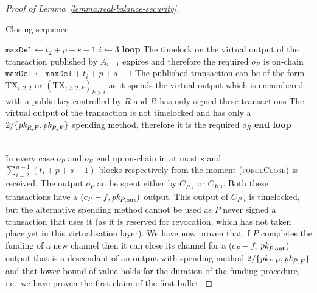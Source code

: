 \begin{proof}[Proof of Lemma~\ref{lemma:real-balance-security}]
  \begin{center}
    \begin{notitlebox}{Closing sequence}
      \begin{algorithmic}[1]
        \State $\texttt{maxDel} \gets t_2 + p + s - 1$ 
        \State $i \gets 3$
        \label{code:settling-process:init-i}
        \State \textbf{loop}
        \Indent
            \State The timelock on the virtual output of the transaction
            published by $A_{i-1}$ expires and therefore the required $o_R$ is
            on-chain
          \Else \: 
            \State $\texttt{maxDel} \gets \texttt{maxDel} + t_i + p + s - 1$
            \State The published transaction can be of the form $\mathrm{TX}_{i,
            2, 2}$ or $(\mathrm{TX}_{i, 3, 2, k})_{k > i}$ as it spends the
            virtual output which is encumbered with a public key controlled by
            $R$ and $R$ has only signed these transactions
             
              \State The virtual output of the transaction is not timelocked and
              has only a $2/\{\textit{pk}_{R, F}, \textit{pk}_{\bar{R}, F}\}$ spending method,
              therefore it is the required $o_R$
            \Else \: 
              \label{code:settling-process:increment}
            \EndIf
          \EndIf
        \EndIndent
        \State \textbf{end loop}
        \State {}
      \end{algorithmic}
    \end{notitlebox}
    \label{code:settling-process}
  \end{center} \ \\

  In every case $o_P$ and $o_R$ end up on-chain in at most $s$ and
  $\sum\limits_{i=2}^{n-1}(t_i + p + s - 1)$ blocks respectively from the moment
  (\textsc{forceClose}) is received. The output $o_P$ an be spent either by $C_{P,
  i}$ or $C_{\bar{P}, i}$. Both these transactions have a $(c_P - f, \textit{pk}_{P,
  \mathrm{out}})$ output. This output of $C_{P, i}$ is timelocked, but the
  alternative spending method cannot be used as $P$ never signed a transaction
  that uses it (as it is reserved for revocation, which has not taken place yet
  in this virtualisation layer). We have now proven that if $P$ completes the
  funding of a new channel then it can close its channel for a ($c_P - f$,
  $\textit{pk}_{P, \mathrm{out}}$) output that is a descendant of an output with spending
  method $2/\{\textit{pk}_{P, F}, \textit{pk}_{\bar{P}, F}\}$ and that lower bound of value holds
  for the duration of the funding procedure, i.e.\ we have proven the first claim
  of the first bullet.


\end{proof}
